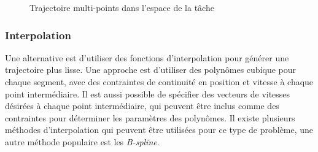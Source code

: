 \begin{figure}[ht]
        \centering
        \caption{Trajectoire multi-points dans l'espace de la tâche}
			\label{fig:traj_multi_point}
\end{figure}


\subsubsection{Interpolation}

Une alternative est d'utiliser des fonctions d'interpolation pour générer une trajectoire plus lisse. Une approche est d'utiliser des polynômes cubique pour chaque segment, avec des contraintes de continuité en position et vitesse à chaque point intermédiaire. Il est aussi possible de spécifier des vecteurs de vitesses désirées à chaque point intermédiaire, qui peuvent être inclus comme des contraintes pour déterminer les paramètres des polynômes. Il existe plusieurs méthodes d'interpolation qui peuvent être utilisées pour ce type de problème, une autre méthode populaire est les \textit{B-spline}. 


